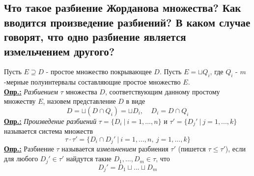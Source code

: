 
\subsection{Что такое разбиение Жорданова множества? Как вводится произведение разбиений? В каком случае говорят, что одно разбиение является измельчением другого?}

Пусть $E \supseteq D$ - простое множество покрывающее $D$. Пусть $E = \sqcup Q_i$, где $Q_i$ - $m$-мерные полуинтервалы составляющие простое множество $E$. \\
\textbf{\underline{Опр.:} } \textit{Разбиением $\tau$} множества $D$, соответствующим данному простому множеству $E$, назовем представление $D$ в виде 
\[D = \sqcup(D\cap Q_i) = \sqcup D_i, \ \ \ \ \ D_i = D\cap Q_i\]
\textbf{\underline{Опр.:} } \textit{Произведение разбиений} $\tau = \{D_i \ | \ i = 1, ..., n\}$ и $\tau' = \{D_j' \ | \ j = 1, ..., k\}$ называется система множеств
\[\tau\cdot\tau' = \{D_i\cap D_j'\ | \ i = 1, ..., n, \ j = 1, ..., k\}\]
\textbf{\underline{Опр.:} } Разбиение $\tau$ называется \textit{измельчением} разбиения $\tau'$ (пишется $\tau \leq \tau'$), если для любого $D_j' \in \tau'$ найдутся такие $D_1, ..., D_m \in \tau$, что 
\[D_j' = D_1\sqcup ... \sqcup D_m\]

